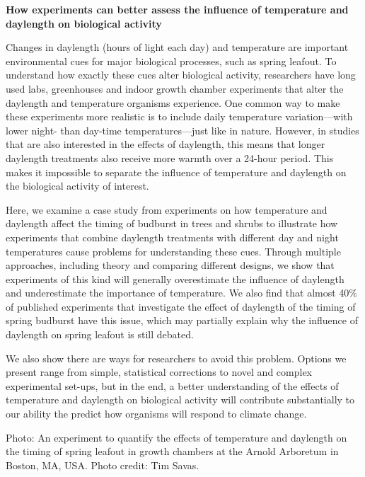 \documentclass[11pt]{article}
\begin{document}
\textbf{How experiments can better assess the influence of temperature and daylength on biological activity}

Changes in daylength (hours of light each day) and temperature are important environmental cues for major biological processes, such as spring leafout. To understand how exactly these cues alter biological activity, researchers have long used labs, greenhouses and indoor growth chamber experiments that alter the daylength and temperature organisms experience. One common way to make these experiments more realistic is to include daily temperature variation---with lower night- than day-time temperatures---just like in nature. However, in studies that are also interested in the effects of daylength, this means that longer daylength treatments also receive more warmth over a 24-hour period. This makes it impossible to separate the influence of temperature and daylength on the biological activity of interest.

Here, we examine a case study from experiments on how temperature and daylength affect the timing of budburst in trees and shrubs to illustrate how experiments that combine daylength treatments with different day and night temperatures cause problems for understanding these cues. Through multiple approaches, including theory and comparing different designs, we show that experiments of this kind will generally overestimate the influence of daylength and underestimate the importance of temperature. We also find that almost 40\% of published experiments that investigate the effect of daylength of the timing of spring budburst have this issue, which may partially explain why the influence of daylength on spring leafout is still debated.

We also show there are ways for researchers to avoid this problem. Options we present range from simple, statistical corrections to novel and complex experimental set-ups, but in the end, a better understanding of the effects of temperature and daylength on biological activity will contribute substantially to our ability the predict how organisms will respond to climate change.
 
 
Photo: An experiment to quantify the effects of temperature and daylength on the timing of spring leafout in growth chambers at the Arnold Arboretum in Boston, MA, USA. Photo credit: Tim Savas.
 
\end{document}
